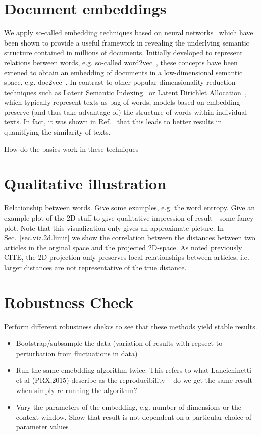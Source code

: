 \documentclass[aps,pre,twocolumn,superscriptaddress]{revtex4-1}
\def\Red#1{{\color{redcolor} #1}}
\begin{document}
\section{Document embeddings}
%
We apply so-called embedding techniques based on neural networks~\cite{Goldberg2016} which have been shown to provide a useful framework in revealing the underlying semantic structure contained in millions of documents.
Initially developed to represent relations between words, e.g. so-called word2vec~\cite{Mikolov2013}, these concepts have been extened to obtain an embedding of documents in a low-dimensional semantic space, e.g. doc2vec~\cite{Le2014}.
In contrast to other popular dimensionality reduction techniques such as Latent Semantic Indexing~\cite{Deerwester1990} or Latent Dirichlet Allocation~\cite{Blei2003}, which typically represent texts as bag-of-words, models based on embedding preserve (and thus take advantage of) the structure of words within individual texts.
In fact, it was shown in Ref.~\cite{Dai2015} that this leads to better results in quanitfying the similarity of texts.

How do the basics work in these techniques

\section{Qualitative illustration}
%
Relationship between words. Give some examples, e.g. the word entropy.
%
Give an example plot of the 2D-stuff to give qualitative impression of result - some fancy plot.
Note that this visualization only gives an approximate picture.
In Sec.~\ref{sec.viz.2d.limit} we show the correlation between the distances between two articles in the orginal space and the projected 2D-space.
As noted previously~\Red{CITE}, the 2D-projection only preserves local relationships between articles, i.e. larger distances are not representative of the true distance.

\section{Robustness Check}
%
Perform different robustness chekcs to see that these methods yield stable results.
\begin{itemize}
 \item Bootstrap/subsample the data (variation of results with repsect to perturbation from fluctuations in data)
 \item Run the same emebdding algorithm twice: This refers to what Lancichinetti et al (PRX,2015) describe as the reproducibility -- do we get the same result when simply re-running the algorithm?
 \item Vary the parameters of the embedding, e.g. number of dimensions or the context-window. Show that result is not dependent on a particular choice of parameter values
\end{itemize}
\end{document}
